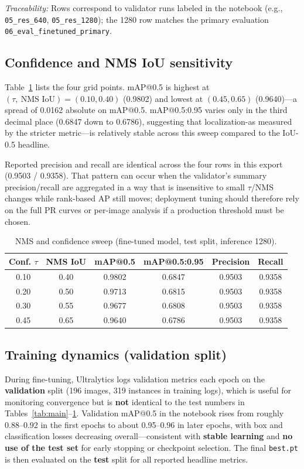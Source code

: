 \documentclass[11pt,a4paper]{article}
\begin{document}
\noindent\textit{Traceability:} Rows correspond to validator runs labeled in the notebook (e.g., \texttt{05\_res\_640}, \texttt{05\_res\_1280}); the \num{1280} row matches the primary evaluation \texttt{06\_eval\_finetuned\_primary}.

\subsection{Confidence and NMS IoU sensitivity}
Table~\ref{tab:nms} lists the four grid points. mAP@0.5 is highest at $(\tau,\ \text{NMS IoU})=(\num{0.10},\num{0.40})$ (\num{0.9802}) and lowest at $(\num{0.45},\num{0.65})$ (\num{0.9640})---a spread of \num{0.0162} absolute on mAP@0.5. mAP@0.5:0.95 varies only in the third decimal place (\num{0.6847} down to \num{0.6786}), suggesting that localization-as measured by the stricter metric---is relatively stable across this sweep compared to the IoU-\num{0.5} headline.

Reported precision and recall are identical across the four rows in this export (\num{0.9503} / \num{0.9358}). That pattern can occur when the validator's summary precision/recall are aggregated in a way that is insensitive to small $\tau$/NMS changes while rank-based AP still moves; deployment tuning should therefore rely on the full PR curves or per-image analysis if a production threshold must be chosen.

\begin{table}[htbp]
  \centering
  \caption{NMS and confidence sweep (fine-tuned model, test split, inference \num{1280}).}
  \label{tab:nms}
  \begin{tabular}{@{}cccccc@{}}
    \toprule
    Conf. $\tau$ & NMS IoU & mAP@0.5 & mAP@0.5:0.95 & Precision & Recall \\
    \midrule
    0.10 & 0.40 & 0.9802 & 0.6847 & 0.9503 & 0.9358 \\
    0.20 & 0.50 & 0.9713 & 0.6815 & 0.9503 & 0.9358 \\
    0.30 & 0.55 & 0.9677 & 0.6808 & 0.9503 & 0.9358 \\
    0.45 & 0.65 & 0.9640 & 0.6786 & 0.9503 & 0.9358 \\
    \bottomrule
  \end{tabular}
\end{table}

\subsection{Training dynamics (validation split)}
\label{sec:training}
During fine-tuning, Ultralytics logs validation metrics each epoch on the \textbf{validation} split (\num{196} images, \num{319} instances in training logs), which is useful for monitoring convergence but is \textbf{not} identical to the test numbers in Tables~\ref{tab:main}--\ref{tab:nms}. Validation mAP@0.5 in the notebook rises from roughly \num{0.88}--\num{0.92} in the first epochs to about \num{0.95}--\num{0.96} in later epochs, with box and classification losses decreasing overall---consistent with \textbf{stable learning} and \textbf{no use of the test set} for early stopping or checkpoint selection. The final \texttt{best.pt} is then evaluated on the \textbf{test} split for all reported headline metrics.
\end{document}
